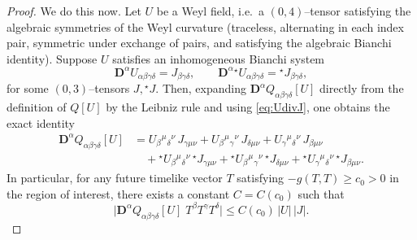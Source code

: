 \documentclass{amsart}
\begin{document}
{\begin{proof}
\medskip

\noindent We do this now.
Let $U$ be a Weyl field, i.e.\ a $(0,4)$--tensor satisfying the algebraic symmetries of the Weyl curvature
(traceless, alternating in each index pair, symmetric under exchange of pairs, and satisfying the algebraic
Bianchi identity).  Suppose $U$ satisfies an inhomogeneous Bianchi system
\begin{equation}\label{eq:UdivJ}
\mathbf D^\alpha U_{\alpha\beta\gamma\delta}=J_{\beta\gamma\delta},
\qquad
\mathbf D^\alpha {}^\star U_{\alpha\beta\gamma\delta}={}^\star J_{\beta\gamma\delta},
\end{equation}
for some $(0,3)$--tensors $J,{}^\star J$.  Then, expanding $\mathbf D^\alpha Q_{\alpha\beta\gamma\delta}[U]$
directly from the definition of $Q[U]$ by the Leibniz rule and using \eqref{eq:UdivJ}, one obtains the exact identity
\begin{align}
\label{eq:divQ_withJ_exact}
\mathbf D^\alpha Q_{\alpha\beta\gamma\delta}[U]
&=
U_{\beta}{}^{\mu}{}_{\delta}{}^{\nu}\,J_{\gamma\mu\nu}
+
U_{\beta}{}^{\mu}{}_{\gamma}{}^{\nu}\,J_{\delta\mu\nu}
+
U_{\gamma}{}^{\mu}{}_{\delta}{}^{\nu}\,J_{\beta\mu\nu}\nonumber\\
&\quad
+
{}^\star U_{\beta}{}^{\mu}{}_{\delta}{}^{\nu}\,{}^\star J_{\gamma\mu\nu}
+
{}^\star U_{\beta}{}^{\mu}{}_{\gamma}{}^{\nu}\,{}^\star J_{\delta\mu\nu}
+
{}^\star U_{\gamma}{}^{\mu}{}_{\delta}{}^{\nu}\,{}^\star J_{\beta\mu\nu}.
\end{align}
In particular, for any future timelike vector $T$ satisfying $-g(T,T)\ge c_{0}>0$ in the region of interest,
there exists a constant $C=C(c_{0})$ such that
\begin{equation}
\label{eq:divQ_contraction_bound}
\big|\mathbf D^\alpha Q_{\alpha\beta\gamma\delta}[U]\;T^\beta T^\gamma T^\delta\big|
\le C(c_{0})\,|U|\,|J|.
\end{equation}


\end{proof}}
\end{document}
